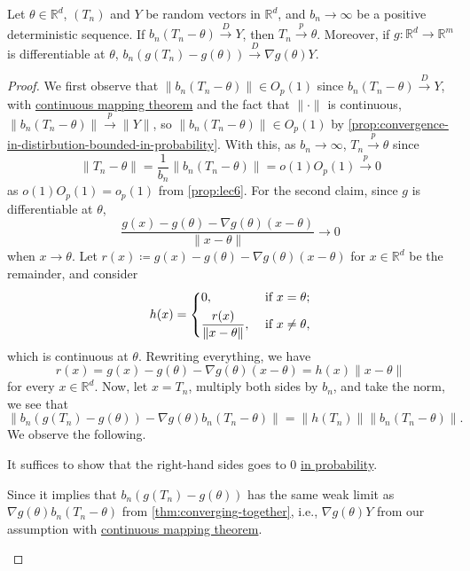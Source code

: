 \begin{theorem}\label{thm:delta-method}
	Let \(\theta \in \mathbb{R} ^d\), \((T_n)\) and \(Y\) be random vectors in \(\mathbb{R} ^d\), and \(b_n \to \infty \) be a positive deterministic sequence. If \(b_n (T_n - \theta ) \overset{D}{\to } Y\), then \(T_n \overset{p}{\to } \theta \). Moreover, if \(g \colon \mathbb{R} ^d \to \mathbb{R} ^m\) is differentiable at \(\theta \), \(b_n (g(T_n) - g(\theta )) \overset{D}{\to } \nabla g(\theta ) Y\).
\end{theorem}
\begin{proof}
	We first observe that \(\lVert b_n (T_n - \theta ) \rVert \in O_p(1)\) since \(b_n(T_n - \theta ) \overset{D}{\to } Y\), with \hyperref[thm:continuous-mapping]{continuous mapping theorem} and the fact that \(\lVert \cdot \rVert \) is continuous, \(\lVert b_n (T_n - \theta ) \rVert \overset{p}{\to } \lVert Y \rVert \), so \(\lVert b_n (T_n - \theta ) \rVert \in O_p(1)\) by \autoref{prop:convergence-in-distirbution-bounded-in-probability}. With this, as \(b_n \to \infty \), \(T_n \overset{p}{\to } \theta \) since
	\[
		\lVert T_n - \theta \rVert
		= \frac{1}{b_n} \lVert b_n (T_n - \theta ) \rVert
		= o(1) O_p(1)
		\overset{p}{\to } 0
	\]
	as \(o(1) O_p(1) = o_p(1)\) from \autoref{prop:lec6}. For the second claim, since \(g\) is differentiable at \(\theta \),
	\[
		\frac{g(x) - g(\theta ) - \nabla g(\theta ) (x - \theta )}{\lVert x - \theta \rVert } \to 0
	\]
	when \(x \to \theta \). Let \(r(x) \coloneqq g(x) - g(\theta ) - \nabla g(\theta ) (x - \theta )\) for \(x \in \mathbb{R} ^d\) be the remainder, and consider
	\[
		h(x) = \begin{dcases}
			0,                                       & \text{ if } x = \theta  ;   \\
			\frac{r(x)}{\lVert x - \theta  \rVert }, & \text{ if } x \neq \theta ,
		\end{dcases}
	\]
	which is continuous at \(\theta \). Rewriting everything, we have
	\[
		r(x)
		= g(x) - g(\theta ) - \nabla g(\theta ) (x - \theta )
		= h(x) \lVert x - \theta \rVert
	\]
	for every \(x \in \mathbb{R} ^d\). Now, let \(x = T_n\), multiply both sides by \(b_n\), and take the norm, we see that
	\[
		\left\lVert b_n \left( g(T_n) - g(\theta ) \right)  - \nabla g(\theta ) b_n (T_n - \theta ) \right\rVert
		= \lVert h(T_n) \rVert \lVert  b_n (T_n - \theta ) \rVert.
	\]
	We observe the following.

	\begin{claim}
		It suffices to show that the right-hand sides goes to \(0\) \hyperref[def:converge-in-probability]{in probability}.
	\end{claim}
	\begin{explanation}
		Since it implies that \(b_n(g(T_n) - g(\theta ))\) has the same weak limit as \(\nabla g(\theta ) b_n (T_n - \theta )\) from \autoref{thm:converging-together}, i.e., \(\nabla g(\theta ) Y\) from our assumption with \hyperref[thm:continuous-mapping]{continuous mapping theorem}.
	\end{explanation}


\end{proof}

